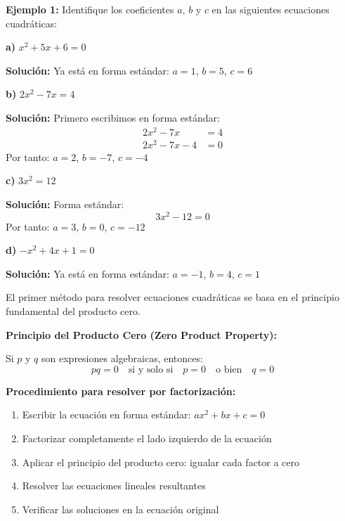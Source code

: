 \begin{example}
\textbf{Ejemplo 1:} Identifique los coeficientes $a$, $b$ y $c$ en las siguientes ecuaciones cuadráticas:

\textbf{a)} $x^2 + 5x + 6 = 0$

\textbf{Solución:} Ya está en forma estándar: $a = 1$, $b = 5$, $c = 6$

\textbf{b)} $2x^2 - 7x = 4$

\textbf{Solución:} Primero escribimos en forma estándar:
\begin{align}
2x^2 - 7x &= 4\\
2x^2 - 7x - 4 &= 0
\end{align}
Por tanto: $a = 2$, $b = -7$, $c = -4$

\textbf{c)} $3x^2 = 12$

\textbf{Solución:} Forma estándar:
$$3x^2 - 12 = 0$$
Por tanto: $a = 3$, $b = 0$, $c = -12$

\textbf{d)} $-x^2 + 4x + 1 = 0$

\textbf{Solución:} Ya está en forma estándar: $a = -1$, $b = 4$, $c = 1$
\end{example}


El primer método para resolver ecuaciones cuadráticas se basa en el principio fundamental del producto cero.

\begin{theorem}
\textbf{Principio del Producto Cero (Zero Product Property):}

Si $p$ y $q$ son expresiones algebraicas, entonces:
$$pq = 0 \quad \text{si y solo si} \quad p = 0 \quad \text{o bien} \quad q = 0$$
\end{theorem}

\textbf{Procedimiento para resolver por factorización:}

\begin{enumerate}
\item Escribir la ecuación en forma estándar: $ax^2 + bx + c = 0$
\item Factorizar completamente el lado izquierdo de la ecuación
\item Aplicar el principio del producto cero: igualar cada factor a cero
\item Resolver las ecuaciones lineales resultantes
\item Verificar las soluciones en la ecuación original
\end{enumerate}

